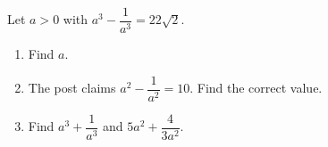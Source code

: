 Let $a>0$ with $a^3-\dfrac1{a^3}=22\sqrt2$.
\begin{enumerate}
\item[(a)] Find $a$.
\item[(b)] The post claims $a^2-\dfrac1{a^2}=10$. Find the correct value.
\item[(c)] Find $a^3+\dfrac1{a^3}$ and $5a^2+\dfrac{4}{3a^2}$.
\end{enumerate}
